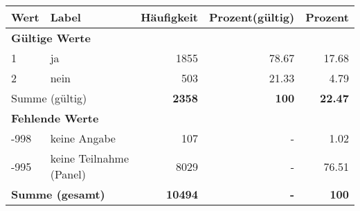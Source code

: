      \begin{longtable}{lXrrr}
     \toprule
     \textbf{Wert} & \textbf{Label} & \textbf{Häufigkeit} & \textbf{Prozent(gültig)} & \textbf{Prozent} \\
     \endhead
     \midrule
     \multicolumn{5}{l}{\textbf{Gültige Werte}}\\

     1 &
     \multicolumn{1}{X}{ ja   } &


       \num{1855} &
       \num[round-mode=places,round-precision=2]{78,67} &
         \num[round-mode=places,round-precision=2]{17,68} \\

     2 &
     \multicolumn{1}{X}{ nein   } &


       \num{503} &
       \num[round-mode=places,round-precision=2]{21,33} &
         \num[round-mode=places,round-precision=2]{4,79} \\
     \midrule
     \multicolumn{2}{l}{Summe (gültig)} &
       \textbf{\num{2358}} &
     \textbf{100} &
       \textbf{\num[round-mode=places,round-precision=2]{22,47}} \\
     \multicolumn{5}{l}{\textbf{Fehlende Werte}}\\
       -998 &
       keine Angabe &
         \num{107} &
        - &
         \num[round-mode=places,round-precision=2]{1,02} \\
       -995 &
       keine Teilnahme (Panel) &
         \num{8029} &
        - &
         \num[round-mode=places,round-precision=2]{76,51} \\
     \midrule
     \multicolumn{2}{l}{\textbf{Summe (gesamt)}} &
          \textbf{\num{10494}} &
        \textbf{-} &
        \textbf{100} \\
     \bottomrule
     \end{longtable}
     
